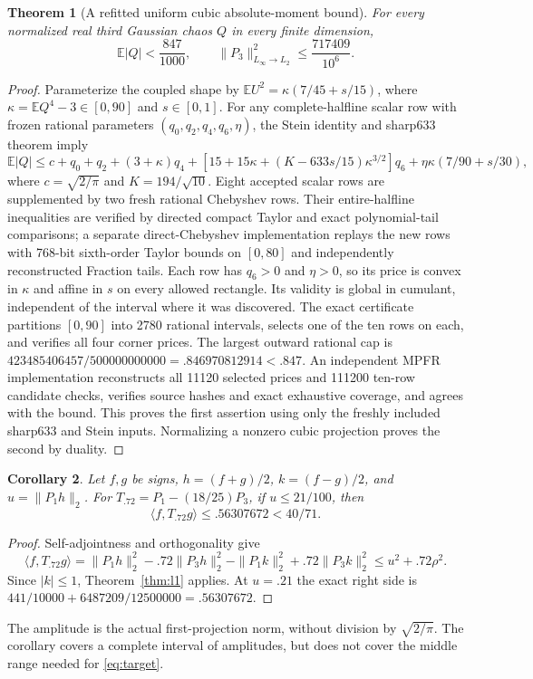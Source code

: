 \documentclass[11pt]{article}
\newtheorem{theorem}{Theorem}
\newtheorem{corollary}[theorem]{Corollary}
\begin{document}
\begin{theorem}[A refitted uniform cubic absolute-moment bound]\label{thm:l1-repriced}
For every normalized real third Gaussian chaos $Q$ in every finite dimension,
\[
 \mathbb E|Q|<\frac{847}{1000},\qquad
 \|P_3\|_{L_\infty\to L_2}^2\le\frac{717409}{10^6}.
\]
\end{theorem}
\begin{proof}
Parameterize the coupled shape by
$\mathbb E U^2=\kappa(7/45+s/15)$, where
$\kappa=\mathbb E Q^4-3\in[0,90]$ and $s\in[0,1]$.
For any complete-halfline scalar row with frozen rational parameters
$(q_0,q_2,q_4,q_6,\eta)$, the Stein identity and sharp633 theorem imply
\[
\mathbb E|Q|\le c+q_0+q_2+(3+\kappa)q_4
+[15+15\kappa+(K-633s/15)\kappa^{3/2}]q_6
+\eta\kappa(7/90+s/30),
\]
where $c=\sqrt{2/\pi}$ and $K=194/\sqrt{10}$.
Eight accepted scalar rows are supplemented by two fresh rational Chebyshev rows.
Their entire-halfline inequalities are verified by directed compact Taylor
and exact polynomial-tail comparisons; a separate direct-Chebyshev
implementation replays the new rows with 768-bit sixth-order Taylor bounds
on $[0,80]$ and independently reconstructed Fraction tails.
Each row has $q_6>0$ and $\eta>0$, so its price is convex in $\kappa$
and affine in $s$ on every allowed rectangle. Its validity is global in
cumulant, independent of the interval where it was discovered.
The exact certificate partitions $[0,90]$ into 2780 rational intervals,
selects one of the ten rows on each, and verifies all four corner prices.
The largest outward rational cap is
$423485406457/500000000000=.846970812914<.847$.
An independent MPFR implementation reconstructs all 11120 selected
prices and 111200 ten-row candidate checks, verifies source hashes and
exact exhaustive coverage, and agrees with the bound. This proves the
first assertion using only the freshly included sharp633 and Stein inputs.
Normalizing a nonzero cubic projection proves the second by duality.
\end{proof}

\begin{corollary}\label{cor:low}
Let $f,g$ be signs, $h=(f+g)/2$, $k=(f-g)/2$, and
$u=\|P_1h\|_2$. For $T_{.72}=P_1-(18/25)P_3$, if $u\le21/100$, then
\begin{equation}\label{eq:lowcap}
 \langle f,T_{.72}g\rangle\le.56307672<40/71.
\end{equation}
\end{corollary}
\begin{proof}
Self-adjointness and orthogonality give
\[
 \langle f,T_{.72}g\rangle
 =\|P_1h\|_2^2-.72\|P_3h\|_2^2
 -\|P_1k\|_2^2+.72\|P_3k\|_2^2
 \le u^2+.72\rho^2.
\]
Since $|k|\le1$, Theorem~\ref{thm:l1} applies. At $u=.21$ the exact
right side is $441/10000+6487209/12500000=.56307672$.
\end{proof}
The amplitude is the actual first-projection norm, without division by
$\sqrt{2/\pi}$. The corollary covers a complete interval of amplitudes,
but does not cover the middle range needed for \eqref{eq:target}.
\end{document}
